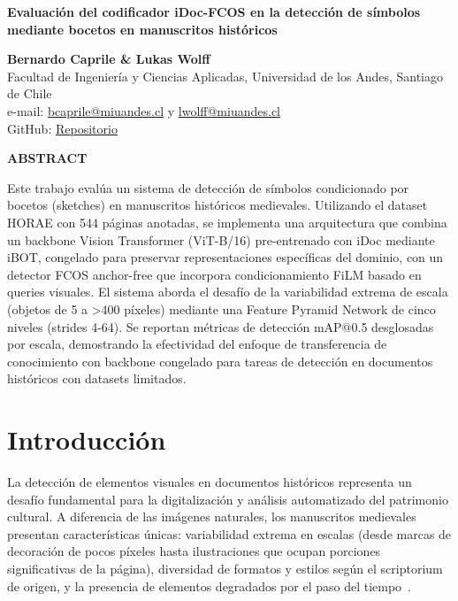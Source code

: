 \documentclass[11pt]{article}
\begin{document}
    \begin{center}
        
    \vspace*{1cm}


    \textbf{\Large Evaluación del codificador iDoc-FCOS en la detección de símbolos mediante bocetos en manuscritos históricos}
  
    \vspace{1cm}
    
    \textbf{Bernardo Caprile \& Lukas Wolff}\\
    Facultad de Ingeniería y Ciencias Aplicadas, Universidad de los Andes, Santiago de Chile\\
    e-mail: \href{mailto:bcaprile@miuandes.cl}{bcaprile@miuandes.cl} y \href{mailto:lwolff@miuandes.cl}{lwolff@miuandes.cl}\\
    GitHub: \href{https://github.com/LukasWolff2002/TAREA_1_RECON_VISUAL/tree/master}{Repositorio}
    \vspace{1cm}
    
    \textbf{ABSTRACT}
    \end{center}
    \vspace{0.5cm}
    
    Este trabajo evalúa un sistema de detección de símbolos condicionado por bocetos (sketches) en manuscritos históricos medievales. Utilizando el dataset HORAE con 544 páginas anotadas, se implementa una arquitectura que combina un backbone Vision Transformer (ViT-B/16) pre-entrenado con iDoc mediante iBOT, congelado para preservar representaciones específicas del dominio, con un detector FCOS anchor-free que incorpora condicionamiento FiLM basado en queries visuales. El sistema aborda el desafío de la variabilidad extrema de escala (objetos de 5 a >400 píxeles) mediante una Feature Pyramid Network de cinco niveles (strides 4-64). Se reportan métricas de detección mAP@0.5 desglosadas por escala, demostrando la efectividad del enfoque de transferencia de conocimiento con backbone congelado para tareas de detección en documentos históricos con datasets limitados.


    \vspace{0.5cm}

\section{Introducción}

La detección de elementos visuales en documentos históricos representa un desafío fundamental para la digitalización y análisis automatizado del patrimonio cultural. A diferencia de las imágenes naturales, los manuscritos medievales presentan características únicas: variabilidad extrema en escalas (desde marcas de decoración de pocos píxeles hasta ilustraciones que ocupan porciones significativas de la página), diversidad de formatos y estilos según el scriptorium de origen, y la presencia de elementos degradados por el paso del tiempo~\cite{clausner2018icfhr, coustaty2011historical}.
\end{document}
